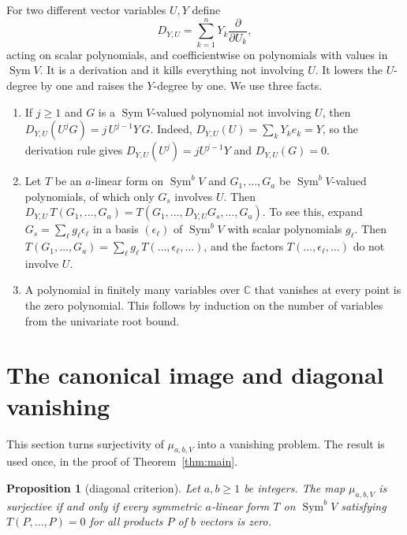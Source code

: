 \documentclass[11pt]{article}
\newtheorem{proposition}[theorem]{Proposition}
\theoremstyle{remark}
\DeclareMathOperator{\Sym}{Sym}
\newcommand{\C}{\mathbb C}
\newcommand{\D}[2]{D_{#1,#2}}
\begin{document}
For two different vector variables $U,Y$ define
\[
 \D{Y}{U}=\sum_{k=1}^n Y_k\frac{\partial}{\partial U_k},
\]
acting on scalar polynomials, and coefficientwise on polynomials with
values in $\Sym V$. It is a derivation and it kills everything not
involving $U$. It lowers the $U$-degree by one and raises the $Y$-degree by
one. We use three facts.
\begin{enumerate}[label=(D\arabic*),leftmargin=3.2em]
\item\label{D1} If $j\ge1$ and $G$ is a $\Sym V$-valued polynomial not
 involving $U$, then $\D YU(U^jG)=j\,U^{j-1}Y\,G$. Indeed,
 $\D YU(U)=\sum_kY_ke_k=Y$, so the derivation rule gives
 $\D YU(U^j)=jU^{j-1}Y$ and $\D YU(G)=0$.
\item\label{D2} Let $T$ be an $a$-linear form on $\Sym^bV$ and
 $G_1,\ldots,G_a$ be $\Sym^bV$-valued polynomials, of which only $G_s$
 involves $U$. Then
 $\D YU\,T(G_1,\ldots,G_a)=T(G_1,\ldots,\D YUG_s,\ldots,G_a)$.
 To see this, expand $G_s=\sum_\ell g_\ell\epsilon_\ell$ in a basis
 $(\epsilon_\ell)$ of $\Sym^bV$ with scalar polynomials $g_\ell$. Then
 $T(G_1,\ldots,G_a)=\sum_\ell g_\ell\,T(\ldots,\epsilon_\ell,\ldots)$, and
 the factors $T(\ldots,\epsilon_\ell,\ldots)$ do not involve $U$.
\item\label{D3} A polynomial in finitely many variables over $\C$ that
 vanishes at every point is the zero polynomial. This follows by induction
 on the number of variables from the univariate root bound.
\end{enumerate}

\section{The canonical image and diagonal vanishing}\label{sec:map}

This section turns surjectivity of $\mu_{a,b,V}$ into a vanishing problem.
The result is used once, in the proof of Theorem~\ref{thm:main}.

\begin{proposition}[diagonal criterion]\label{prop:criterion}
Let $a,b\ge1$ be integers. The map $\mu_{a,b,V}$ is surjective if and only
if every symmetric $a$-linear form $T$ on $\Sym^b V$ satisfying
$T(P,\ldots,P)=0$ for all products $P$ of $b$ vectors is zero.
\end{proposition}
\end{document}
